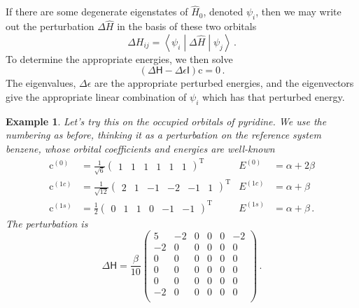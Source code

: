 \documentclass{article}
\theoremstyle{plain}\theoremheaderfont{\normalfont\itshape}\theorembodyfont{\rmfamily}\theoremseparator{.}\newtheorem*{rem}{Remark}\newtheorem*{ex}{Example}\newtheorem*{proof}{Proof}\newtheorem*{altp}{Alternative proof}
\theoremstyle{plain}\theoremheaderfont{\normalfont\bfseries}\theorembodyfont{\rmfamily}\theoremseparator{.}\newtheorem{thm}{Theorem}[section]\newtheorem{lem}[thm]{Lemma}\newtheorem{prop}[thm]{Proposition}\newtheorem*{cor}{Corollary}\newtheorem{defn}[thm]{Definition}\newtheorem{clm}[thm]{Claim}\newtheorem{clminproof}{Claim}\newtheorem{pos}{Postulate}[section]
\theoremstyle{break}\theoremheaderfont{\normalfont\itshape}\theorembodyfont{\rmfamily}\theoremseparator{.\medskip}\newtheorem*{proofskip}{Proof}\newtheorem*{exs}{Examples}\newtheorem*{rems}{Remarks}
\theoremstyle{break}\theoremheaderfont{\normalfont\bfseries}\theorembodyfont{\rmfamily}\theoremseparator{.\medskip}\newtheorem{lemskip}[thm]{Lemma}\newtheorem{defnskip}[thm]{Definition}\newtheorem{propskip}[thm]{Proposition}\newtheorem{thmskip}[thm]{Theorem}
\numberwithin{equation}{section}
\newcommand{\tp}{^\mathrm{T}}
\newcommand{\mel}[3]{\left\langle #1 \middle| #2 \middle| #3 \right\rangle}
\newcommand{\vb}[1]{\bm{\mathrm{#1}}}
\begin{document}
    If there are some degenerate eigenstates of \(\hat{H}_0\), denoted \(\psi_i\), then we may write out the perturbation \(\Delta \hat{H}\) in the basis of these two orbitals
    \begin{equation}
        \Delta H_{ij}=\mel{\psi_i}{\Delta \hat{H}}{\psi_j}\,.
    \end{equation}
    To determine the appropriate energies, we then solve
    \begin{equation}
        (\mathsf{\Delta H}-\Delta\epsilon\mathsf{I})\vb{c}=\vb{0}\,.
    \end{equation}
    The eigenvalues, \(\Delta\epsilon\) are the appropriate perturbed energies, and the eigenvectors give the appropriate linear combination of \(\psi_i\) which has that perturbed energy.
    \begin{ex}
        Let's try this on the occupied orbitals of pyridine. We use the numbering as before, thinking it as a perturbation on the reference system benzene, whose orbital coefficients and energies are well-known
        \begin{align}
            \vb{c}^{(0)}&=\frac{1}{\sqrt{6}}\begin{pmatrix}
                1 & 1 & 1 & 1 & 1 & 1
            \end{pmatrix}\tp & E^{(0)}&=\alpha+2\beta \\
            \vb{c}^{(1c)}&=\frac{1}{\sqrt{12}}\begin{pmatrix}
                2 & 1 & -1 & -2 & -1 & 1
            \end{pmatrix}\tp & E^{(1c)}&=\alpha+\beta \\
            \vb{c}^{(1s)}&=\frac{1}{2}\begin{pmatrix}
                0 & 1 & 1 & 0 & -1 & -1
            \end{pmatrix}\tp & E^{(1s)}&=\alpha+\beta\,.
        \end{align}
        The perturbation is
        \begin{equation}
            \mathsf{\Delta H}=\frac{\beta}{10}\begin{pmatrix}
                5 & -2 & 0 & 0 & 0 & -2 \\
                -2 & 0 & 0 & 0 & 0 & 0 \\
                0 & 0 & 0 & 0 & 0 & 0 \\
                0 & 0 & 0 & 0 & 0 & 0 \\
                0 & 0 & 0 & 0 & 0 & 0 \\
                -2 & 0 & 0 & 0 & 0 & 0 \\
            \end{pmatrix}\,.
        \end{equation}


\end{ex}
\end{document}
